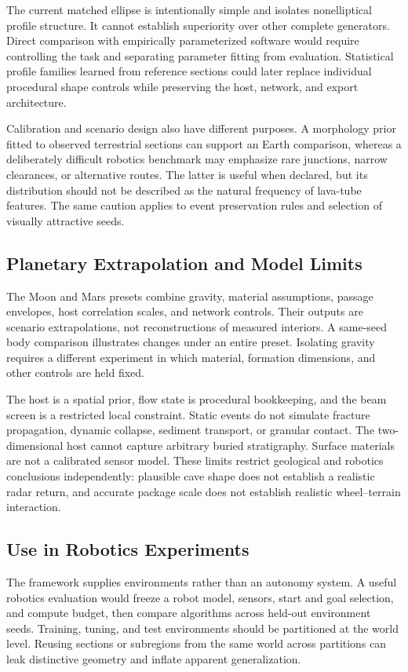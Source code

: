 \documentclass[conference]{IEEEtran}
\begin{document}
The current matched ellipse is intentionally simple and isolates nonelliptical profile structure. It cannot establish superiority over other complete generators. Direct comparison with empirically parameterized software would require controlling the task and separating parameter fitting from evaluation. Statistical profile families learned from reference sections could later replace individual procedural shape controls while preserving the host, network, and export architecture.

Calibration and scenario design also have different purposes. A morphology prior fitted to observed terrestrial sections can support an Earth comparison, whereas a deliberately difficult robotics benchmark may emphasize rare junctions, narrow clearances, or alternative routes. The latter is useful when declared, but its distribution should not be described as the natural frequency of lava-tube features. The same caution applies to event preservation rules and selection of visually attractive seeds.

\subsection{Planetary Extrapolation and Model Limits}
The Moon and Mars presets combine gravity, material assumptions, passage envelopes, host correlation scales, and network controls. Their outputs are scenario extrapolations, not reconstructions of measured interiors. A same-seed body comparison illustrates changes under an entire preset. Isolating gravity requires a different experiment in which material, formation dimensions, and other controls are held fixed.

The host is a spatial prior, flow state is procedural bookkeeping, and the beam screen is a restricted local constraint. Static events do not simulate fracture propagation, dynamic collapse, sediment transport, or granular contact. The two-dimensional host cannot capture arbitrary buried stratigraphy. Surface materials are not a calibrated sensor model. These limits restrict geological and robotics conclusions independently: plausible cave shape does not establish a realistic radar return, and accurate package scale does not establish realistic wheel--terrain interaction.

\subsection{Use in Robotics Experiments}
The framework supplies environments rather than an autonomy system. A useful robotics evaluation would freeze a robot model, sensors, start and goal selection, and compute budget, then compare algorithms across held-out environment seeds. Training, tuning, and test environments should be partitioned at the world level. Reusing sections or subregions from the same world across partitions can leak distinctive geometry and inflate apparent generalization.
\end{document}
